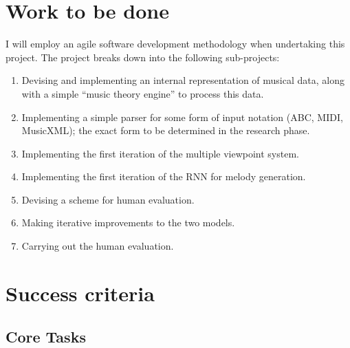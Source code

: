 \documentclass[12pt,a4paper,twoside]{article}
\begin{document}
\section*{Work to be done}

I will employ an agile software development methodology when undertaking this
project. The project breaks down into the following sub-projects:

\begin{enumerate}

\item Devising and implementing an internal representation of musical data,
	along with a simple ``music theory engine'' to process this data.  

\item Implementing a simple parser for some form of input notation (ABC, MIDI,
	MusicXML); the exact form to be determined in the research phase.  

\item Implementing the first iteration of the multiple viewpoint system.

\item Implementing the first iteration of the RNN for melody generation.  

\item Devising a scheme for human evaluation.

\item Making iterative improvements to the two models.

\item Carrying out the human evaluation.

\end{enumerate}

\section*{Success criteria}

\subsection*{Core Tasks}
\end{document}
